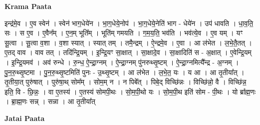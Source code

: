 \documentclass[17pt]{extarticle}
\begin{document}
\textbf{Krama Paata} \newline

इन्द्र॑मे॒व । ए॒व स्वेन॑ । स्वेन॑ भाग॒धेये॑न । भा॒ग॒धेये॒नोप॑ । भा॒ग॒धेये॒नेति॑ भाग - धेये॑न । उप॑ धावति । धा॒व॒ति॒ सः । स ए॒व । ए॒वैन᳚म् । ए॒न॒म् भूति᳚म् । भूति॑म् गमयति । ग॒म॒य॒ति॒ भव॑ति । भव॑त्ये॒व । ए॒व यम् । यꣳ सू॒त्वा । सू॒त्वा व॒शा । व॒शा स्यात् । स्यात् तम् । तमै॒न्द्रम् । ऐ॒न्द्रमे॒व । ए॒वा । आ ल॑भेत । ल॒भे॒तै॒तत् । ए॒तद् वाव । वाव तत् । तदि॑न्द्रि॒यम् । इ॒न्द्रि॒यꣳ सा॒क्षात् । सा॒क्षादे॒व । सा॒क्षादिति॑ स - अ॒क्षात् । ए॒वेन्द्रि॒यम् । इ॒न्द्रि॒यमव॑ । अव॑ रुन्धे । रु॒न्ध॒ ऐ॒न्द्रा॒ग्नम् । ऐ॒न्द्रा॒ग्नम् पु॑नरुथ्सृ॒ष्टम् । ऐ॒न्द्रा॒ग्नमित्यै᳚न्द्र - अ॒ग्नम् । पु॒न॒रु॒थ्सृ॒ष्टमा । पु॒न॒रु॒थ्सृ॒ष्टमिति॑ पुनः - उ॒थ्सृ॒ष्टम् । आ ल॑भेत । ल॒भे॒त॒ यः । य आ । आ तृ॒तीया᳚त् । तृ॒तीया॒त् पुरु॑षात् । पुरु॑षा॒थ् सोम᳚म् । सोम॒म् न । न पिबे᳚त् । पिबे॒द् विच्छि॑न्नः । विच्छि॑न्नो॒ वै । विच्छि॑न्न॒ इति॒ वि - छि॒न्नः॒ । वा ए॒तस्य॑ । ए॒तस्य॑ सोमपी॒थः । सो॒म॒पी॒थो यः । सो॒म॒पी॒थ इति॑ सोम - पी॒थः । यो ब्रा᳚ह्म॒णः । ब्रा॒ह्म॒णः सन्न् । सन्ना । आ तृ॒तीया᳚त् \newline

\textbf{Jatai Paata} \newline
\end{document}
